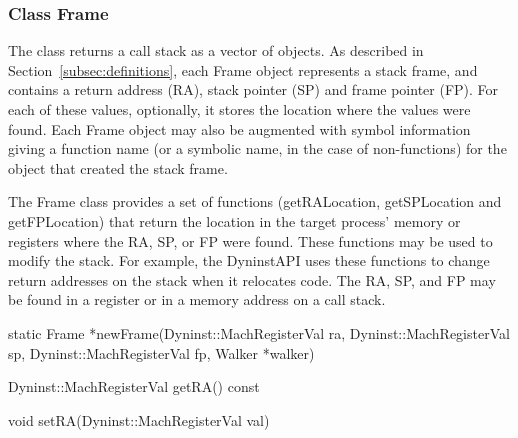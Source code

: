 \subsubsection{Class Frame}
\label{subsec:frame}
	
The  class returns a call stack as a vector of  objects. As described
in Section~\ref{subsec:definitions}, each Frame object represents a stack frame, and contains a
return address (RA), stack pointer (SP) and frame pointer (FP). For each of
these values, optionally, it stores the location where the values were found.
Each Frame object may also be augmented with symbol information giving a
function name (or a symbolic name, in the case of non-functions) for the object
that created the stack frame.

The Frame class provides a set of functions (getRALocation, getSPLocation and
getFPLocation) that return the location in the target process' memory or
registers where the RA, SP, or FP were found. These functions may be used to
modify the stack. For example, the DyninstAPI uses these functions to change
return addresses on the stack when it relocates code. The RA, SP, and FP may be
found in a register or in a memory address on a call stack. 

\begin{apient}
static Frame *newFrame(Dyninst::MachRegisterVal ra,
                       Dyninst::MachRegisterVal sp, 
                       Dyninst::MachRegisterVal fp, 
                       Walker *walker)
\end{apient}

\begin{apient}
Dyninst::MachRegisterVal getRA() const
\end{apient}

\begin{apient}
void setRA(Dyninst::MachRegisterVal val)
\end{apient}

